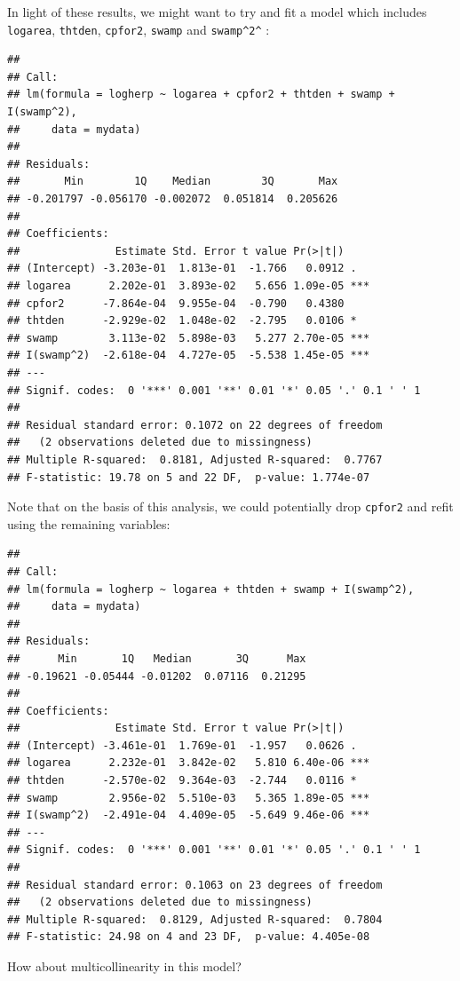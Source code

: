 \documentclass[
  12pt,
]{book}
\begin{document}
In light of these results, we might want to try and fit a model which includes \texttt{logarea}, \texttt{thtden}, \texttt{cpfor2}, \texttt{swamp} and \texttt{swamp\^{}2\^{}} :

\begin{verbatim}
## 
## Call:
## lm(formula = logherp ~ logarea + cpfor2 + thtden + swamp + I(swamp^2), 
##     data = mydata)
## 
## Residuals:
##       Min        1Q    Median        3Q       Max 
## -0.201797 -0.056170 -0.002072  0.051814  0.205626 
## 
## Coefficients:
##               Estimate Std. Error t value Pr(>|t|)    
## (Intercept) -3.203e-01  1.813e-01  -1.766   0.0912 .  
## logarea      2.202e-01  3.893e-02   5.656 1.09e-05 ***
## cpfor2      -7.864e-04  9.955e-04  -0.790   0.4380    
## thtden      -2.929e-02  1.048e-02  -2.795   0.0106 *  
## swamp        3.113e-02  5.898e-03   5.277 2.70e-05 ***
## I(swamp^2)  -2.618e-04  4.727e-05  -5.538 1.45e-05 ***
## ---
## Signif. codes:  0 '***' 0.001 '**' 0.01 '*' 0.05 '.' 0.1 ' ' 1
## 
## Residual standard error: 0.1072 on 22 degrees of freedom
##   (2 observations deleted due to missingness)
## Multiple R-squared:  0.8181, Adjusted R-squared:  0.7767 
## F-statistic: 19.78 on 5 and 22 DF,  p-value: 1.774e-07
\end{verbatim}

Note that on the basis of this analysis, we could potentially drop \texttt{cpfor2} and refit using the remaining variables:

\begin{verbatim}
## 
## Call:
## lm(formula = logherp ~ logarea + thtden + swamp + I(swamp^2), 
##     data = mydata)
## 
## Residuals:
##      Min       1Q   Median       3Q      Max 
## -0.19621 -0.05444 -0.01202  0.07116  0.21295 
## 
## Coefficients:
##               Estimate Std. Error t value Pr(>|t|)    
## (Intercept) -3.461e-01  1.769e-01  -1.957   0.0626 .  
## logarea      2.232e-01  3.842e-02   5.810 6.40e-06 ***
## thtden      -2.570e-02  9.364e-03  -2.744   0.0116 *  
## swamp        2.956e-02  5.510e-03   5.365 1.89e-05 ***
## I(swamp^2)  -2.491e-04  4.409e-05  -5.649 9.46e-06 ***
## ---
## Signif. codes:  0 '***' 0.001 '**' 0.01 '*' 0.05 '.' 0.1 ' ' 1
## 
## Residual standard error: 0.1063 on 23 degrees of freedom
##   (2 observations deleted due to missingness)
## Multiple R-squared:  0.8129, Adjusted R-squared:  0.7804 
## F-statistic: 24.98 on 4 and 23 DF,  p-value: 4.405e-08
\end{verbatim}

How about multicollinearity in this model?
\end{document}
